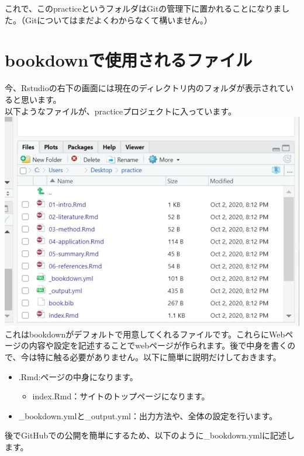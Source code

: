 \documentclass[
]{book}
\providecommand{\tightlist}{%
  \setlength{\itemsep}{0pt}\setlength{\parskip}{0pt}}
\begin{document}
これで、このpracticeというフォルダはGitの管理下に置かれることになりました。（Gitについてはまだよくわからなくて構いません。）

\hypertarget{bookdownux3067ux4f7fux7528ux3055ux308cux308bux30d5ux30a1ux30a4ux30eb}{%
\section{bookdownで使用されるファイル}\label{bookdownux3067ux4f7fux7528ux3055ux308cux308bux30d5ux30a1ux30a4ux30eb}}

今、Rstudioの右下の画面には現在のディレクトリ内のフォルダが表示されていると思います。\\
以下ようなファイルが、practiceプロジェクトに入っています。
\includegraphics{pics/bookdown_files.jpg}
これはbookdownがデフォルトで用意してくれるファイルです。これらにWebページの内容や設定を記述することでwebページが作られます。後で中身を書くので、今は特に触る必要がありません。以下に簡単に説明だけしておきます。

\begin{itemize}
\tightlist
\item
  .Rmd:ページの中身になります。

  \begin{itemize}
  \tightlist
  \item
    index.Rmd：サイトのトップページになります。\\
  \end{itemize}
\item
  \_bookdown.ymlと\_output.yml：出力方法や、全体の設定を行います。
\end{itemize}

後でGitHubでの公開を簡単にするため、以下のように\_bookdown.ymlに記述します。
\end{document}

